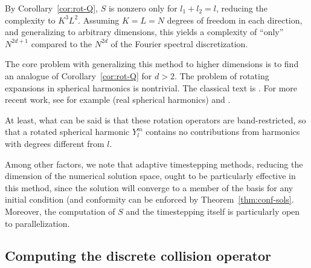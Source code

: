 By Corollary~\ref{cor:rot-Q}, $S$ is nonzero only for $l_1+l_2=l$, reducing the complexity to $K^3L^2$.
Assuming $K=L=N$ degrees of freedom in each direction, and generalizing to arbitrary dimensions, this yields a
complexity of ``only'' $N^{2d+1}$ compared to the $N^{2d}$ of the Fourier spectral discretization.
\begin{remark} \label{rem:rot-pol}
The core problem with generalizing this method to higher dimensions is to find an analogue of
Corollary~\ref{cor:rot-Q} for $d>2$. The problem of rotating expansions in spherical harmonics is nontrivial.
The classical text is \cite{Wigner1931gaq}. For more recent work, see for example \cite{Ivanic1996rmr} (real spherical
harmonics) and \cite{Lessig2012ear}.

At least, what can be said is that these rotation operators are band-restricted, so that a rotated spherical
harmonic $Y_l^m$ contains no contributions from harmonics with degrees different from $l$.
\end{remark}

Among other factors, we note that adaptive timestepping methods, reducing the dimension of the numerical
solution space, ought to be particularly effective in this method, since the solution will converge to a
member of the basis for any initial condition (and conformity can be enforced by Theorem~\ref{thm:conf-sols}.
Moreover, the computation of $S$ and the timestepping itself is particularly open to parallelization.

\subsection{Computing the discrete collision operator}

